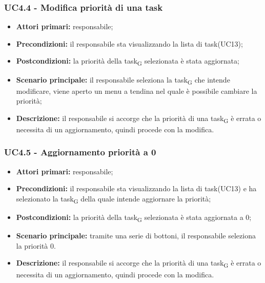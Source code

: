 \subsubsection{UC4.4 - Modifica priorità di una task}
\begin{itemize}
	\item 	\textbf{Attori primari:} responsabile;
	\item 	\textbf{Precondizioni:} il responsabile sta visualizzando la lista di task(UC13);
	\item 	\textbf{Postcondizioni:} la priorità della task\textsubscript{G} selezionata è stata aggiornata;
	\item 	\textbf{Scenario principale:} il responsabile seleziona la task\textsubscript{G} che intende modificare, viene aperto un menu a tendina nel quale è possibile cambiare la priorità;
	\item 	\textbf{Descrizione:} il responsabile si accorge che la priorità di una task\textsubscript{G} è errata o necessita di un aggiornamento, quindi procede con la modifica.
\end{itemize}

\subsubsection{UC4.5 - Aggiornamento priorità a 0}
\begin{itemize}
	\item 	\textbf{Attori primari:} responsabile;
	\item 	\textbf{Precondizioni:} il responsabile sta visualizzando la lista di task(UC13) e ha selezionato la task\textsubscript{G} della quale intende aggiornare la priorità;
	\item 	\textbf{Postcondizioni:} la priorità della task\textsubscript{G} selezionata è stata aggiornata a 0;
	\item 	\textbf{Scenario principale:} tramite una serie di bottoni, il responsabile seleziona la priorità 0.
	\item 	\textbf{Descrizione:} il responsabile si accorge che la priorità di una task\textsubscript{G} è errata o necessita di un aggiornamento, quindi procede con la modifica.
\end{itemize}
